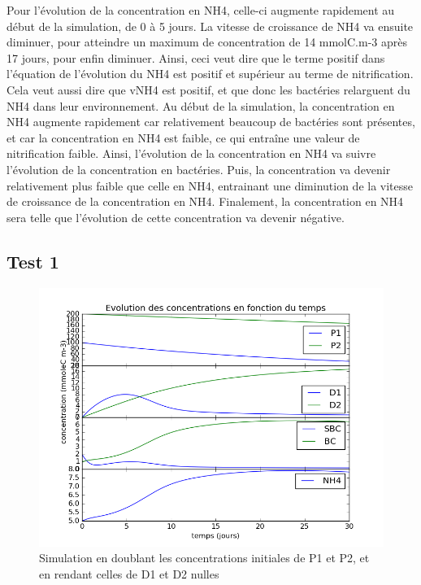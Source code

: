 \par{
Pour l'\'evolution de la concentration en NH4, celle-ci augmente rapidement au d\'ebut de la simulation, de 0 \`a 5 jours. La vitesse de croissance de NH4 va ensuite diminuer, pour atteindre un maximum de concentration de 14 mmolC.m-3 apr\`es 17 jours, pour enfin diminuer. Ainsi, ceci veut dire que le terme positif dans l'\'equation de l'\'evolution du NH4 est positif et sup\'erieur au terme de nitrification. Cela veut aussi dire que vNH4 est positif, et que donc les bact\'eries relarguent du NH4 dans leur environnement. Au d\'ebut de la simulation, la concentration en NH4 augmente rapidement car relativement beaucoup de bact\'eries sont pr\'esentes, et car la concentration en NH4 est faible, ce qui entra\^ine une valeur de nitrification faible. Ainsi, l'\'evolution de la concentration en NH4 va suivre l'\'evolution de la concentration en bact\'eries. Puis, la concentration va devenir relativement plus faible que celle en NH4, entrainant une diminution de la vitesse de croissance de la concentration en NH4. Finalement, la concentration en NH4 sera telle que l'\'evolution de cette concentration va devenir n\'egative.
}

\subsection{Test 1}

\begin{figure}[h!]
  \includegraphics[width=\textwidth]{partie2/Test1.png}
  \caption{Simulation en doublant les concentrations initiales de P1 et P2, et en rendant celles de D1 et D2 nulles
  }
  \label{fig:partie2test1}
\end{figure}

